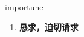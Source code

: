 
\begin{frame}
{\huge importune}
\begin{center}
\begin{enumerate}\Large
  \item \textbf{恳求，迫切请求}
\end{enumerate}
\end{center}
\end{frame}
